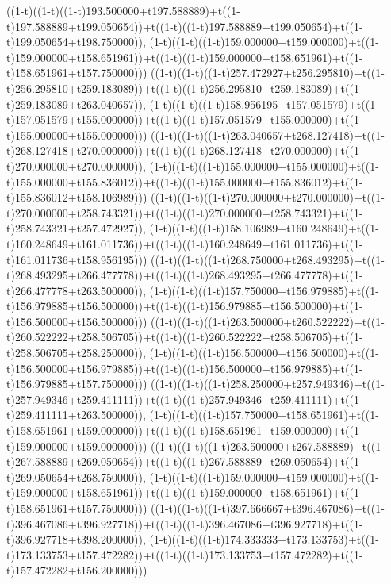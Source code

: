 ((1-t)((1-t)((1-t)193.500000+t197.588889)+t((1-t)197.588889+t199.050654))+t((1-t)((1-t)197.588889+t199.050654)+t((1-t)199.050654+t198.750000)),                                     (1-t)((1-t)((1-t)159.000000+t159.000000)+t((1-t)159.000000+t158.651961))+t((1-t)((1-t)159.000000+t158.651961)+t((1-t)158.651961+t157.750000)))
((1-t)((1-t)((1-t)257.472927+t256.295810)+t((1-t)256.295810+t259.183089))+t((1-t)((1-t)256.295810+t259.183089)+t((1-t)259.183089+t263.040657)),                                     (1-t)((1-t)((1-t)158.956195+t157.051579)+t((1-t)157.051579+t155.000000))+t((1-t)((1-t)157.051579+t155.000000)+t((1-t)155.000000+t155.000000)))
((1-t)((1-t)((1-t)263.040657+t268.127418)+t((1-t)268.127418+t270.000000))+t((1-t)((1-t)268.127418+t270.000000)+t((1-t)270.000000+t270.000000)),                                     (1-t)((1-t)((1-t)155.000000+t155.000000)+t((1-t)155.000000+t155.836012))+t((1-t)((1-t)155.000000+t155.836012)+t((1-t)155.836012+t158.106989)))
((1-t)((1-t)((1-t)270.000000+t270.000000)+t((1-t)270.000000+t258.743321))+t((1-t)((1-t)270.000000+t258.743321)+t((1-t)258.743321+t257.472927)),                                     (1-t)((1-t)((1-t)158.106989+t160.248649)+t((1-t)160.248649+t161.011736))+t((1-t)((1-t)160.248649+t161.011736)+t((1-t)161.011736+t158.956195)))
((1-t)((1-t)((1-t)268.750000+t268.493295)+t((1-t)268.493295+t266.477778))+t((1-t)((1-t)268.493295+t266.477778)+t((1-t)266.477778+t263.500000)),                                     (1-t)((1-t)((1-t)157.750000+t156.979885)+t((1-t)156.979885+t156.500000))+t((1-t)((1-t)156.979885+t156.500000)+t((1-t)156.500000+t156.500000)))
((1-t)((1-t)((1-t)263.500000+t260.522222)+t((1-t)260.522222+t258.506705))+t((1-t)((1-t)260.522222+t258.506705)+t((1-t)258.506705+t258.250000)),                                     (1-t)((1-t)((1-t)156.500000+t156.500000)+t((1-t)156.500000+t156.979885))+t((1-t)((1-t)156.500000+t156.979885)+t((1-t)156.979885+t157.750000)))
((1-t)((1-t)((1-t)258.250000+t257.949346)+t((1-t)257.949346+t259.411111))+t((1-t)((1-t)257.949346+t259.411111)+t((1-t)259.411111+t263.500000)),                                     (1-t)((1-t)((1-t)157.750000+t158.651961)+t((1-t)158.651961+t159.000000))+t((1-t)((1-t)158.651961+t159.000000)+t((1-t)159.000000+t159.000000)))
((1-t)((1-t)((1-t)263.500000+t267.588889)+t((1-t)267.588889+t269.050654))+t((1-t)((1-t)267.588889+t269.050654)+t((1-t)269.050654+t268.750000)),                                     (1-t)((1-t)((1-t)159.000000+t159.000000)+t((1-t)159.000000+t158.651961))+t((1-t)((1-t)159.000000+t158.651961)+t((1-t)158.651961+t157.750000)))
((1-t)((1-t)((1-t)397.666667+t396.467086)+t((1-t)396.467086+t396.927718))+t((1-t)((1-t)396.467086+t396.927718)+t((1-t)396.927718+t398.200000)),                                     (1-t)((1-t)((1-t)174.333333+t173.133753)+t((1-t)173.133753+t157.472282))+t((1-t)((1-t)173.133753+t157.472282)+t((1-t)157.472282+t156.200000)))
